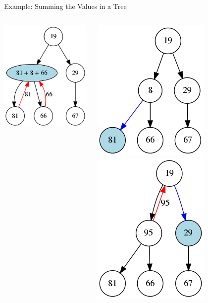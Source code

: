 \documentclass[11pt]{beamer}
\begin{document}
\begin{frame}{Example: Summing the Values in a Tree}
\begin{columns}
\begin{column}{0.33\textwidth}
\includegraphics[scale=0.3]{graphs/summing_tree_5.png}
\end{column}
\begin{column}{0.33\textwidth}
\center
\includegraphics[scale=0.3]{graphs/summing_tree_3.png}
\includegraphics[scale=0.3]{graphs/summing_tree_6.png}
\end{column}
\end{columns}
\end{frame}
\end{document}
